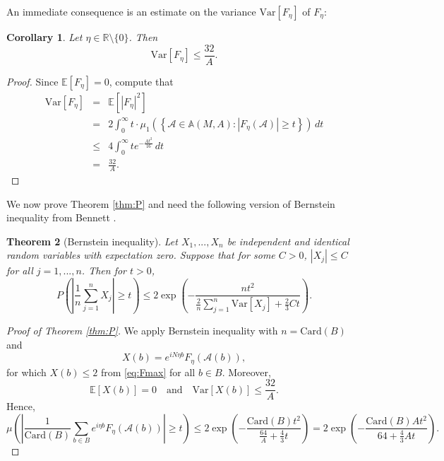 \documentclass[12pt,reqno]{amsart}
\newcommand\Ab{\mathbb{A}}
\newcommand\Ac{\mathcal{A}}
\newcommand\Card{\mathrm{Card}}
\newcommand\E{\mathbb{E}}
\newcommand\R{\mathbb{R}}
\newcommand\Var{\mathrm{Var}}
\theoremstyle{plain}
\newtheorem{thm}{\textbf{Theorem}}[section]
\newtheorem{cor}[thm]{\textbf{Corollary}}
\theoremstyle{remark}
\numberwithin{equation}{section}
\begin{document}
An immediate consequence is an estimate on the variance $\Var[F_\eta]$ of $F_\eta$:
\begin{cor}\label{cor:var}
Let $\eta\in\R\setminus\{0\}$. Then
$$\Var\left[F_\eta\right]\le\frac{32}{A}.$$
\end{cor}
\begin{proof}
Since $\E[F_\eta]=0$, compute that
\begin{eqnarray*}
\Var\left[F_\eta\right]&=&\E\left[\left|F_\eta\right|^2\right]\\
&=&2\int_0^\infty t\cdot\mu_1\left(\left\{\Ac\in\Ab(M,A):\left|F_\eta(\Ac)\right|\ge t\right\}\right)\,dt\\
&\le&4\int_0^\infty te^{-\frac{At^2}{16}}\,dt\\
&=&\frac{32}{A}.
\end{eqnarray*}
\end{proof}

We now prove Theorem \ref{thm:P} and need the following version of Bernstein inequality from Bennett \cite{B}.
\begin{thm}[Bernstein inequality]
Let $X_1,...,X_n$ be independent and identical random variables with expectation zero. Suppose that for some $C>0$, $|X_j|\le C$ for all $j=1,...,n$. Then for $t>0$,
$$P\left(\left|\frac1n\sum_{j=1}^nX_j\right|\ge t\right)\le2\exp\left(-\frac{nt^2}{\frac2n\sum_{j=1}^n\Var\left[X_j\right]+\frac23Ct}\right).$$
\end{thm}

\begin{proof}[Proof of Theorem \ref{thm:P}]
We apply Bernstein inequality with $n=\Card(B)$ and
$$X(b)=e^{iN\eta b}F_\eta\left(\Ac(b)\right),$$
for which $X(b)\le2$ from \eqref{eq:Fmax} for all $b\in B$. Moreover, 
$$\E[X(b)]=0\quad\text{and}\quad\Var[X(b)]\le\frac{32}{A}.$$
Hence,
$$\mu\left(\left|\frac{1}{\Card(B)}\sum_{b\in B}e^{i\eta b}F_\eta\left(\Ac(b)\right)\right|\ge t\right)\le2\exp\left(-\frac{\Card(B)t^2}{\frac{64}{A}+\frac43t}\right)=2\exp\left(-\frac{\Card(B)At^2}{64+\frac43At}\right).$$
\end{proof}
\end{document}
